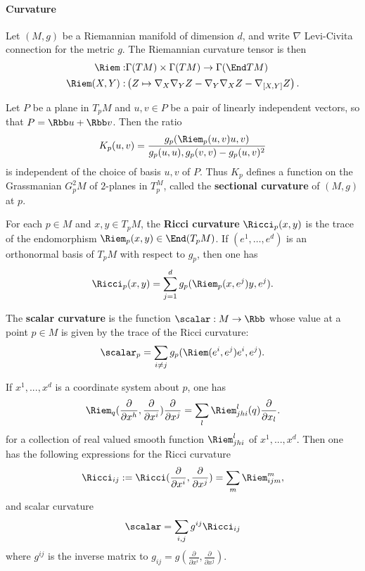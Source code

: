 \paragraph{Curvature}
Let $(M,g)$ be a Riemannian manifold of dimension $d$, and write $\nabla$ Levi-Civita connection for the metric $g$. The Riemannian curvature tensor is then
\begin{align}
  \Riem :     & \Gamma(TM)\times \Gamma(TM)  \to  \Gamma(\End TM)                                                              \\
  \Riem(X,Y): & \left( Z                          \mapsto  \nabla_X \nabla_Y Z - \nabla_Y \nabla_X Z -\nabla_{[X,Y]}Z \right).
\end{align}


Let $P$ be a plane in $T_p M$ and $u,v \in P$ be a pair of linearly independent vectors, so that $P =\Rbb u + \Rbb v$. Then the ratio
\begin{align}
  K_p(u,v) = \frac{g_p(\Riem_p(u,v)u,v)}{g_p(u,u),g_p(v,v)-g_p(u,v)^2}
\end{align}
is independent of the choice of basis $u,v$ of $P$. Thus $K_p$ defines a function on the Grassmanian $G^2_p M$  of $2$-planes in $T_p^M$, called the \textbf{sectional curvature} of $(M,g)$ at $p$.

For each $p \in M$ and $x,y\in T_p M$, the \textbf{Ricci curvature} $\Ricci_p(x,y)$ is the trace of the endomorphism $\Riem_p(x,y) \in \End(T_p M)$. If $(e^1,\dots, e^d)$ is an orthonormal basis of $T_p M$ with respect to $g_p$, then one has
\begin{align}
  \Ricci_p(x,y) = \sum_{j=1}^d g_p (\Riem_p(x,e^j)y,e^j).
\end{align}

The \textbf{scalar curvature} is the function $\scalar: M \to \Rbb$ whose value at a point $p\in M$ is given by the trace of the Ricci curvature:
\begin{align}
  \scalar_p = \sum_{i\neq j} g_p (\Riem(e^i,e^j)e^i,e^j).
\end{align}

If $x^1,...,x^d$ is a coordinate system about $p$, one has
\begin{align}
  \Riem_q (\frac{\partial}{\partial x^h}, \frac{\partial}{\partial x^i})\frac{\partial}{\partial x^j} = \sum_l \Riem^l_{jhi}(q) \frac{\partial}{\partial x_l}.
\end{align}
for a collection of real valued smooth function $\Riem^l_{jhi}$ of $x^1,...,x^d$. Then one has the following expressions for the Ricci curvature
\begin{align}
  \Ricci_{ij} := \Ricci(\frac{\partial}{\partial x^i},\frac{\partial}{\partial x^j}) =\sum_{m}\Riem^m_{ijm},
\end{align}
and scalar curvature
\begin{align}
  \scalar = \sum_{i,j} g^{ij} \Ricci_{ij}
\end{align}
where $g^{ij}$ is the inverse matrix to $g_{ij} = g (\frac{\partial}{\partial x^i},\frac{\partial}{\partial x^j})$.

